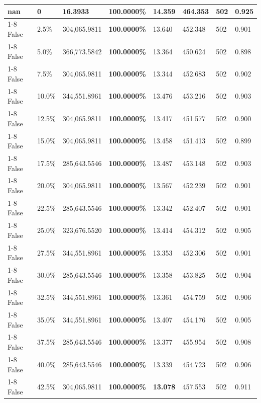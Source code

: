 \begin{table}[H]
{\begin{tabular}{lllrllll}
\midrule
nan & 0 & \bfseries 16.3933 & \bfseries 100.0000\% & 14.359 & 464.353 & 502 & 0.925 \\
\cline{1-8}
False & 2.5\% & 304,065.9811 & \bfseries \color{red} 100.0000\% & 13.640 & 452.348 & 502 & 0.901 \\
\cline{1-8}
False & 5.0\% & 366,773.5842 & \bfseries \color{red} 100.0000\% & 13.364 & 450.624 & 502 & 0.898 \\
\cline{1-8}
False & 7.5\% & 304,065.9811 & \bfseries \color{red} 100.0000\% & 13.344 & 452.683 & 502 & 0.902 \\
\cline{1-8}
False & 10.0\% & 344,551.8961 & \bfseries \color{red} 100.0000\% & 13.476 & 453.216 & 502 & 0.903 \\
\cline{1-8}
False & 12.5\% & 304,065.9811 & \bfseries \color{red} 100.0000\% & 13.417 & 451.577 & 502 & 0.900 \\
\cline{1-8}
False & 15.0\% & 304,065.9811 & \bfseries \color{red} 100.0000\% & 13.458 & 451.413 & 502 & 0.899 \\
\cline{1-8}
False & 17.5\% & 285,643.5546 & \bfseries \color{red} 100.0000\% & 13.487 & 453.148 & 502 & 0.903 \\
\cline{1-8}
False & 20.0\% & 304,065.9811 & \bfseries \color{red} 100.0000\% & 13.567 & 452.239 & 502 & 0.901 \\
\cline{1-8}
False & 22.5\% & 285,643.5546 & \bfseries \color{red} 100.0000\% & 13.342 & 452.407 & 502 & 0.901 \\
\cline{1-8}
False & 25.0\% & 323,676.5520 & \bfseries \color{red} 100.0000\% & 13.414 & 454.312 & 502 & 0.905 \\
\cline{1-8}
False & 27.5\% & 344,551.8961 & \bfseries \color{red} 100.0000\% & 13.353 & 452.306 & 502 & 0.901 \\
\cline{1-8}
False & 30.0\% & 285,643.5546 & \bfseries \color{red} 100.0000\% & 13.358 & 453.825 & 502 & 0.904 \\
\cline{1-8}
False & 32.5\% & 344,551.8961 & \bfseries \color{red} 100.0000\% & 13.361 & 454.759 & 502 & 0.906 \\
\cline{1-8}
False & 35.0\% & 344,551.8961 & \bfseries \color{red} 100.0000\% & 13.407 & 454.176 & 502 & 0.905 \\
\cline{1-8}
False & 37.5\% & 285,643.5546 & \bfseries \color{red} 100.0000\% & 13.377 & 455.954 & 502 & 0.908 \\
\cline{1-8}
False & 40.0\% & 285,643.5546 & \bfseries \color{red} 100.0000\% & 13.339 & 454.723 & 502 & 0.906 \\
\cline{1-8}
False & 42.5\% & 304,065.9811 & \bfseries \color{red} 100.0000\% & \bfseries \color{red} 13.078 & 457.553 & 502 & 0.911 \\

\end{tabular}}
\end{table}

